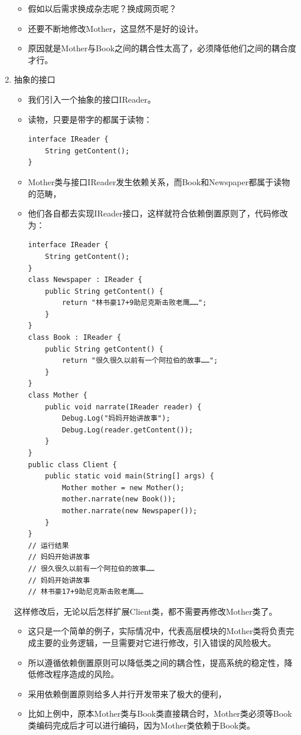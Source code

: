\documentclass[9pt, b5paper]{article}
\begin{document}
\begin{enumerate}
\begin{itemize}
\item 假如以后需求换成杂志呢？换成网页呢？
\item 还要不断地修改Mother，这显然不是好的设计。
\item 原因就是Mother与Book之间的耦合性太高了，必须降低他们之间的耦合度才行。
\end{itemize}
\item 抽象的接口
\label{sec:orgbc2132e}
\begin{itemize}
\item 我们引入一个抽象的接口IReader。
\item 读物，只要是带字的都属于读物：
\begin{verbatim}
interface IReader {
    String getContent();
}
\end{verbatim}
\item Mother类与接口IReader发生依赖关系，而Book和Newspaper都属于读物的范畴，
\item 他们各自都去实现IReader接口，这样就符合依赖倒置原则了，代码修改为：
\begin{verbatim}
interface IReader {
    String getContent();
}
class Newspaper : IReader {
    public String getContent() {
        return "林书豪17+9助尼克斯击败老鹰……";
    }
}
class Book : IReader {
    public String getContent() {
        return "很久很久以前有一个阿拉伯的故事……";
    }
}
class Mother {
    public void narrate(IReader reader) {
        Debug.Log("妈妈开始讲故事");
        Debug.Log(reader.getContent());
    }
}
public class Client {
    public static void main(String[] args) {
        Mother mother = new Mother();
        mother.narrate(new Book());
        mother.narrate(new Newspaper());
    }
}
// 运行结果
// 妈妈开始讲故事 
// 很久很久以前有一个阿拉伯的故事…… 
// 妈妈开始讲故事 
// 林书豪17+9助尼克斯击败老鹰……
\end{verbatim}
\end{itemize}
这样修改后，无论以后怎样扩展Client类，都不需要再修改Mother类了。 
\begin{itemize}
\item 这只是一个简单的例子，实际情况中，代表高层模块的Mother类将负责完成主要的业务逻辑，一旦需要对它进行修改，引入错误的风险极大。
\item 所以遵循依赖倒置原则可以降低类之间的耦合性，提高系统的稳定性，降低修改程序造成的风险。
\item 采用依赖倒置原则给多人并行开发带来了极大的便利，
\item 比如上例中，原本Mother类与Book类直接耦合时，Mother类必须等Book类编码完成后才可以进行编码，因为Mother类依赖于Book类。

\end{itemize}
\end{enumerate}
\end{document}
